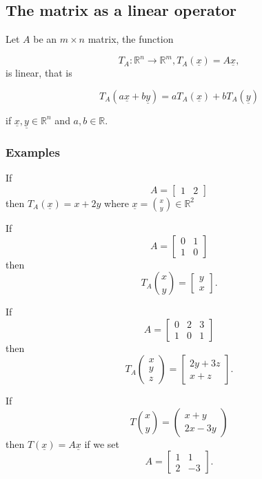 \documentclass[12pt,a4paper]{article}
\theoremstyle{regla}
\theoremstyle{remark}
\theoremstyle{definition}
\theoremstyle{nonumberbreak}
\begin{document}
\subsection{The matrix as a linear operator}
\begin{fbox}
\begin{minipage}{0.97\textwidth}
Let $A$ be an $m\times  n$ matrix, the function
 
 $$T_A:\mathbb{R}^n\to\mathbb{R}^m, T_A(\underline{x}) = A\underline{x}, $$
is linear, that is
 
$$ T_A (a\underline{x} + b\underline{y}) = aT_A(\underline{x}) + bT_A(\underline{y}) $$
 
 if $ \underline{x}, \underline{y} \in \mathbb{R}^n$ and $a, b \in \mathbb{R}$.
\end{minipage}
\end{fbox}
\subsubsection{Examples}
\begin{xmpl}

If 
$$A=\begin{bmatrix}
1 & 2 
\end{bmatrix}$$
then $T_A(\underline{x}) = x + 2y$
where $\underline{x} = {x \choose y}\in \mathbb{R}^2$
\end{xmpl}


\begin{xmpl}
If
$$A=\begin{bmatrix}
0 & 1  \\
1 & 0
\end{bmatrix}$$
then 
$$T_A{x \choose y} = \begin{bmatrix}
y  \\
x
\end{bmatrix}.$$
\end{xmpl}
\begin{xmpl}

If
$$A= \begin{bmatrix}
0 & 2 & 3\\
1 & 0 & 1
\end{bmatrix}$$
then 
$$T_A\left(
\begin{array}{ccc}
  x \\
  y\\
  z
 \end{array} \right) = 
\begin{bmatrix}
2y + 3z\\
x + z
\end{bmatrix}.$$
\end{xmpl}
\begin{xmpl}

If 
$$T{x \choose y } = \left(
 \begin{array}{cc}
   x+y  \\
  2x-3y
 \end{array} \right)$$
then $T (\underline{x}) = A \underline{x}$ if  we set 
$$A = \begin{bmatrix}
1 & 1 \\
2 & -3
\end{bmatrix}.$$
\end{xmpl}
\end{document}

